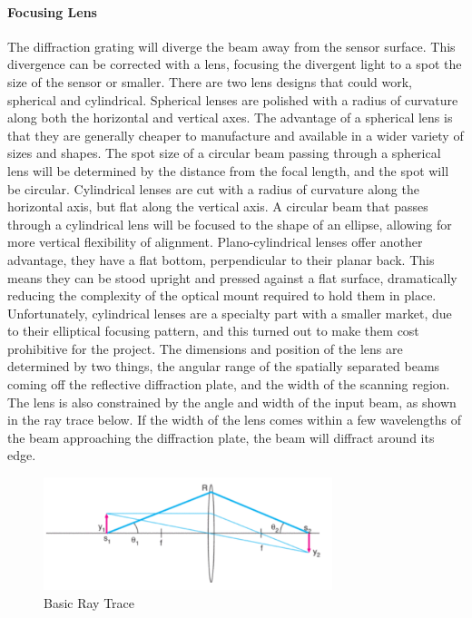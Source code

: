 \paragraph{Focusing Lens} The diffraction grating will diverge the beam away from the sensor surface. This divergence can be corrected with a lens, focusing the divergent light to a spot the size of the sensor or smaller. There are two lens designs that could work, spherical and cylindrical. Spherical lenses are polished with a radius of curvature along both the horizontal and vertical axes. The advantage of a spherical lens is that they are generally cheaper to manufacture and available in a wider variety of sizes and shapes. The spot size of a circular beam passing through a spherical lens will be determined by the distance from the focal length, and the spot will be circular. Cylindrical lenses are cut with a radius of curvature along the horizontal axis, but flat along the vertical axis. A circular beam that passes through a cylindrical lens will be focused to the shape of an ellipse, allowing for more vertical flexibility of alignment. Plano-cylindrical lenses offer another advantage, they have a flat bottom, perpendicular to their planar back. This means they can be stood upright and pressed against a flat surface, dramatically reducing the complexity of the optical mount required to hold them in place. Unfortunately, cylindrical lenses are a specialty part with a smaller market, due to their elliptical focusing pattern, and this turned out to make them cost prohibitive for the project. The dimensions and position of the lens are determined by two things, the angular range of the spatially separated beams coming off the reflective diffraction plate, and the width of the scanning region. The lens is also constrained by the angle and width of the input beam, as shown in the ray trace below. If the width of the lens comes within a few wavelengths of the beam approaching the diffraction plate, the beam will diffract around its edge.

\begin{figure}[H]
    \caption{Basic Ray Trace}
    \centering
    \includegraphics[width=0.75\textwidth]{images/BasicRayTrace.png}
\end{figure}

